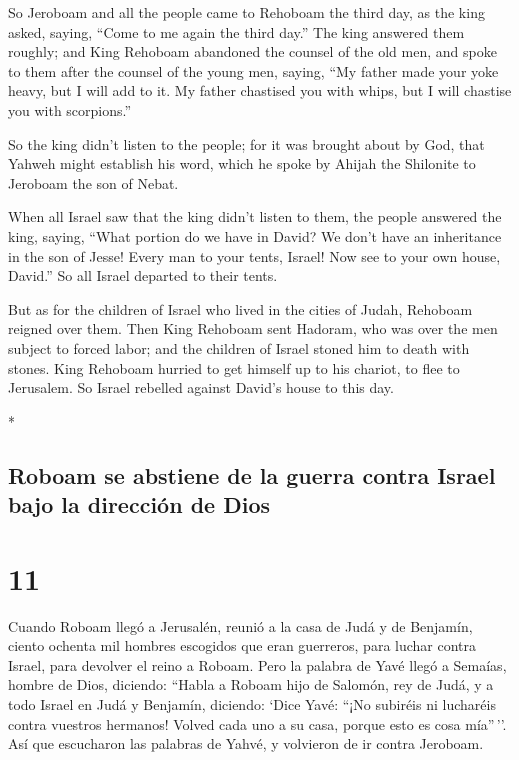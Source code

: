 \begin{paracol}{2}
\begin{otherlanguage}{english}
 So Jeroboam and all the people came to Rehoboam the
third day, as the king asked, saying, ``Come to me again the third
day.''  The king answered them roughly; and King Rehoboam
abandoned the counsel of the old men,  and spoke to them
after the counsel of the young men, saying, ``My father made your yoke
heavy, but I will add to it. My father chastised you with whips, but I
will chastise you with scorpions.''

 So the king didn't listen to the people; for it was
brought about by God, that Yahweh might establish his word, which he
spoke by Ahijah the Shilonite to Jeroboam the son of Nebat.

 When all Israel saw that the king didn't listen to them,
the people answered the king, saying, ``What portion do we have in
David? We don't have an inheritance in the son of Jesse! Every man to
your tents, Israel! Now see to your own house, David.'' So all Israel
departed to their tents.

 But as for the children of Israel who lived in the
cities of Judah, Rehoboam reigned over them.  Then King
Rehoboam sent Hadoram, who was over the men subject to forced labor; and
the children of Israel stoned him to death with stones. King Rehoboam
hurried to get himself up to his chariot, to flee to Jerusalem.
 So Israel rebelled against David's house to this day.

\end{otherlanguage}

\switchcolumn[0]*

\hypertarget{roboam-se-abstiene-de-la-guerra-contra-israel-bajo-la-direcciuxf3n-de-dios}{%
\subsection{Roboam se abstiene de la guerra contra Israel bajo la
dirección de
Dios}\label{roboam-se-abstiene-de-la-guerra-contra-israel-bajo-la-direcciuxf3n-de-dios}}

\hypertarget{section-20}{%
\section{11}\label{section-20}}

 Cuando Roboam llegó a Jerusalén, reunió a la casa de Judá
y de Benjamín, ciento ochenta mil hombres escogidos que eran guerreros,
para luchar contra Israel, para devolver el reino a Roboam.
 Pero la palabra de Yavé llegó a Semaías, hombre de Dios,
diciendo:  ``Habla a Roboam hijo de Salomón, rey de Judá,
y a todo Israel en Judá y Benjamín, diciendo:  `Dice Yavé:
``¡No subiréis ni lucharéis contra vuestros hermanos! Volved cada uno a
su casa, porque esto es cosa mía''\,''. Así que escucharon las palabras
de Yahvé, y volvieron de ir contra Jeroboam.


\end{paracol}
